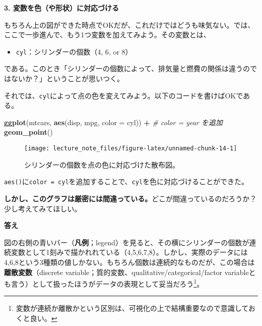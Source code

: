 \documentclass[]{book}
\newenvironment{Shaded}{\begin{snugshade}}{\end{snugshade}}
\newcommand{\KeywordTok}[1]{\textcolor[rgb]{0.13,0.29,0.53}{\textbf{#1}}}
\newcommand{\DataTypeTok}[1]{\textcolor[rgb]{0.13,0.29,0.53}{#1}}
\newcommand{\StringTok}[1]{\textcolor[rgb]{0.31,0.60,0.02}{#1}}
\newcommand{\CommentTok}[1]{\textcolor[rgb]{0.56,0.35,0.01}{\textit{#1}}}
\newcommand{\OperatorTok}[1]{\textcolor[rgb]{0.81,0.36,0.00}{\textbf{#1}}}
\newcommand{\NormalTok}[1]{#1}
\providecommand{\tightlist}{%
  \setlength{\itemsep}{0pt}\setlength{\parskip}{0pt}}
\let\rmarkdownfootnote\footnote%
\def\footnote{\protect\rmarkdownfootnote}
\begin{document}
\textbf{3. 変数を色（や形状）に対応づける}

もちろん上の図ができた時点でOKだが、これだけではどうも味気ない。では、ここで一歩進んで、もう1つ変数を加えてみよう。その変数とは、

\begin{itemize}
\tightlist
\item
  \texttt{cyl}：シリンダーの個数（4, 6, or 8）
\end{itemize}

である。このとき「シリンダーの個数によって、排気量と燃費の関係は違うのではないか？」ということが思いつく。

それでは、\texttt{cyl}によって点の色を変えてみよう。以下のコードを書けばOKである。



\begin{Shaded}
\begin{Highlighting}[]
\KeywordTok{ggplot}\NormalTok{(mtcars, }\KeywordTok{aes}\NormalTok{(disp, mpg, }\DataTypeTok{color =}\NormalTok{ cyl)) }\OperatorTok{+}\StringTok{ }\CommentTok{# color = year を追加}
\StringTok{  }\KeywordTok{geom_point}\NormalTok{()}
\end{Highlighting}
\end{Shaded}

\begin{figure}

{\centering \texttt{[image: lecture\_note\_files/figure-latex/unnamed-chunk-14-1]} 

}

\caption{シリンダーの個数を点の色に対応づけた散布図。}\label{fig:unnamed-chunk-14}
\end{figure}

\texttt{aes()}に\texttt{color\ =\ cyl}を追加することで、\texttt{cyl}を色に対応づけることができた。

\textbf{しかし、このグラフは厳密には間違っている。}どこが間違っているのだろうか？　少し考えてみてほしい。

\textbf{答え}

図の右側の青いバー（\textbf{凡例}；legend）を見ると、その横にシリンダーの個数が連続変数として1刻みで描かれれている（4,5,6,7,8）。しかし、実際のデータには4,6,8という3種類の値しかない。もちろん個数は連続的なものだが、この場合は\textbf{離散変数}（discrete
variable；質的変数、qualitative/categorical/factor
variableとも言う）として扱ったほうがデータの表現として妥当だろう\footnote{変数が連続か離散かという区別は、可視化の上で結構重要なので意識しておくと良い。}。
\end{document}
